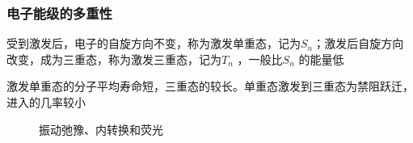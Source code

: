 \subsubsection*{电子能级的多重性}%
\label{subsub*:电子能级的多重性}
受到激发后，电子的自旋方向不变，称为激发单重态，记为$S_{n}$；激发后自旋方向改变，成为三重态，称为激发三重态，记为$T_{n}$ ，一般比$S_{n}$ 的能量低

激发单重态的分子平均寿命短，三重态的较长。单重态激发到三重态为禁阻跃迁，进入的几率较小

\begin{figure}[ht!]
    \centering
    \caption{振动弛豫、内转换和荧光}
    \label{fig:振动弛豫、内转换和荧光}
\end{figure}

